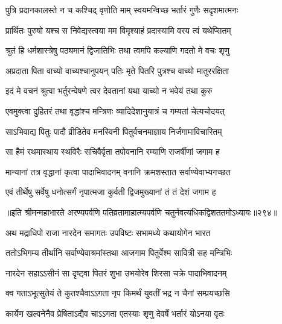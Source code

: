 \begin{center}
\twolineshloka
{पुत्रि प्रदानकालस्ते न च कश्चिद् वृणोति माम्}
{स्वयमन्विच्छ भर्तारं गुणैः सदृशमात्मनः} %

\twolineshloka
{प्रार्थितः पुरुषो यश्च स निवेद्यस्त्वया मम}
{विमृश्याहं प्रदास्यामि वरय त्वं यथेप्सितम्} %

\twolineshloka
{श्रुतं हि धर्मशास्त्रेषु पठ्यमानं द्विजातिभिः}
{तथा त्वमपि कल्याणि गदतो मे वचः शृणु} %

\twolineshloka
{अप्रदाता पिता वाच्यो वाच्यश्चानुपयन् पतिः}
{मृते पितरि पुत्रश्च वाच्यो मातुररक्षिता} %

\twolineshloka
{इदं मे वचनं श्रुत्वा भर्तुरन्वेषणे त्वर}
{देवतानां यथा याच्यो न भवेयं तथा कुरु} %

\twolineshloka
{एवमुक्त्वा दुहितरं तथा वृद्धांश्च मन्त्रिणः}
{व्यादिदेशानुयात्रं च गम्यतां चेत्यचोदयत्} %

\twolineshloka
{साऽभिवाद्य पितुः पादौ व्रीडितेव मनस्विनी}
{पितुर्वचनमाज्ञाय निर्जगामाविचारितम्} %

\twolineshloka
{सा हैमं रथमास्थाय स्थविरैः सचिवैर्वृता}
{तपोवनानि रम्याणि राजर्षीणां जगाम ह} %

\twolineshloka
{मान्यानां तत्र वृद्धानां कृत्वा पादाभिवादनम्}
{वनानि क्रमशस्तात सर्वाण्येवाभ्यगच्छत} %

\twolineshloka
{एवं तीर्थेषु सर्वेषु धनोत्सर्गं नृपात्मजा}
{कुर्वती द्विजमुख्यानां तं तं देशं जगाम ह} %

॥इति श्रीमन्महाभारते अरण्यपर्वणि पतिव्रतामाहात्म्यपर्वणि चतुर्नवत्यधिकद्विशततमोऽध्यायः॥२९४॥

\resetShloka


\twolineshloka
{अथ मद्राधिपो राजा नारदेन समागतः}
{उपविष्टः सभामध्ये कथायोगेन भारत}

\twolineshloka
{ततोऽभिगम्य तीर्थानि सर्वाण्येवाश्रमांस्तथा}
{आजगाम पितुर्वेश्म सावित्री सह मन्त्रिभिः}

\twolineshloka
{नारदेन सहाऽऽसीनं सा दृष्ट्वा पितरं शुभा}
{उभयोरेव शिरसा चक्रे पादाभिवादनम्}


\twolineshloka
{क्व गताऽभूत्सुतेयं ते कुतश्चैवाऽऽगता नृप}
{किमर्थं युवतीं भद्र न चैनां सम्प्रयच्छसि}


\twolineshloka
{कार्येण खल्वनेनैव प्रेषिताऽद्यैव चाऽऽगता}
{एतस्याः शृणु देवर्षे भर्तारं योऽनया वृतः}



\end{center}
